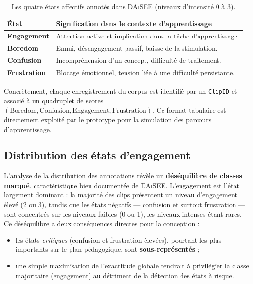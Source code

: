 \begin{table}[H]
\centering
\renewcommand{\arraystretch}{1.2}
\begin{tabular}{>{\bfseries}l p{9.5cm}}
\toprule
État & Signification dans le contexte d'apprentissage \\
\midrule
Engagement  & Attention active et implication dans la tâche d'apprentissage. \\
Boredom     & Ennui, désengagement passif, baisse de la stimulation. \\
Confusion   & Incompréhension d'un concept, difficulté de traitement. \\
Frustration & Blocage émotionnel, tension liée à une difficulté persistante. \\
\bottomrule
\end{tabular}
\caption{Les quatre états affectifs annotés dans \textsc{DAiSEE}
(niveaux d'intensité 0 à 3).}
\label{tab:daisee-etats}
\end{table}

Concrètement, chaque enregistrement du corpus est identifié par un
\texttt{ClipID} et associé à un quadruplet de scores
$(\text{Boredom}, \text{Confusion}, \text{Engagement}, \text{Frustration})$.
Ce format tabulaire est directement exploité par le prototype pour la simulation
des parcours d'apprentissage.

\subsection{Distribution des états d'engagement}

L'analyse de la distribution des annotations révèle un \textbf{déséquilibre de
classes marqué}, caractéristique bien documentée de \textsc{DAiSEE}. L'engagement
est l'état largement dominant : la majorité des clips présentent un niveau
d'engagement élevé (2 ou 3), tandis que les états négatifs — confusion et surtout
frustration — sont concentrés sur les niveaux faibles (0 ou 1), les niveaux
intenses étant rares. Ce déséquilibre a deux conséquences directes pour la
conception :

\begin{itemize}[leftmargin=1.4em]
  \item les états \emph{critiques} (confusion et frustration élevées), pourtant
  les plus importants sur le plan pédagogique, sont \textbf{sous-représentés} ;
  \item une simple maximisation de l'exactitude globale tendrait à privilégier la
  classe majoritaire (engagement) au détriment de la détection des états à risque.
\end{itemize}

